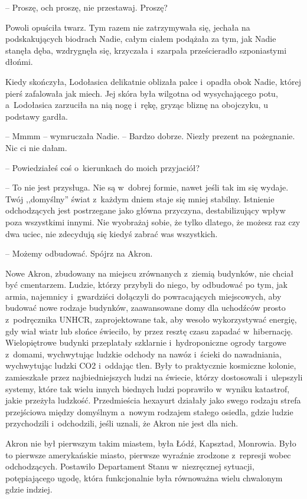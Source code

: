 \documentclass[oneside,polish,11pt,sfheadings]{mwbk}
\begin{document}
-- Proszę, och proszę, nie przestawaj. Proszę?

Powoli opuściła twarz. Tym razem nie zatrzymywała się, jechała na
podskakujących biodrach Nadie, całym ciałem podążała za tym, jak Nadie
stanęła dęba, wzdrygnęła się, krzyczała i~szarpała prześcieradło
szponiastymi dłońmi.

Kiedy skończyła, Lodołasica delikatnie oblizała palce i~opadła obok
Nadie, której pierś zafalowała jak miech. Jej skóra była wilgotna od
wysychającego potu, a~Lodołasica zarzuciła na nią nogę i~rękę, gryząc
bliznę na obojczyku, u podstawy gardła.

-- Mmmm -- wymruczała Nadie. -- Bardzo dobrze. Niezły prezent na
pożegnanie. Nic ci nie dałam.

-- Powiedziałeś coś o~kierunkach do moich przyjaciół?

-- To nie jest przysługa. Nie są w~dobrej formie, nawet jeśli tak im się
wydaje. Twój ,,domyślny'' świat z~każdym dniem staje się mniej stabilny.
Istnienie odchodzących jest postrzegane jako główna przyczyna,
destabilizujący wpływ poza wszystkimi innymi. Nie wyobrażaj sobie, że
tylko dlatego, że możesz raz czy dwa uciec, nie zdecydują się kiedyś
zabrać was wszystkich.

-- Możemy odbudować. Spójrz na Akron.

Nowe Akron, zbudowany na miejscu zrównanych z~ziemią budynków, nie
chciał być cmentarzem. Ludzie, którzy przybyli do niego, by odbudować po
tym, jak armia, najemnicy i~gwardziści dołączyli do powracających
miejscowych, aby budować nowe rodzaje budynków, zaawansowane domy dla
uchodźców prosto z~podręcznika UNHCR, zaprojektowane tak, aby wesoło
wykorzystywać energię, gdy wiał wiatr lub słońce świeciło, by przez
resztę czasu zapadać w~hibernację. Wielopiętrowe budynki przeplatały
szklarnie i~hydroponiczne ogrody targowe z~domami, wychwytując ludzkie
odchody na nawóz i~ścieki do nawadniania, wychwytując ludzki CO2 i~oddając tlen. Były to praktycznie kosmiczne kolonie, zamieszkałe przez
najbiedniejszych ludzi na świecie, którzy dostosowali i~ulepszyli
systemy, które tak wielu innych biednych ludzi poprawiło w~wyniku
katastrof, jakie przeżyła ludzkość. Przedmieścia hexayurt działały jako
swego rodzaju strefa przejściowa między domyślnym a~nowym rodzajem
stałego osiedla, gdzie ludzie przychodzili i~odchodzili, jeśli uznali,
że Akron nie jest dla nich.

Akron nie był pierwszym takim miastem, była Łódź, Kapsztad, Monrowia.
Było to pierwsze amerykańskie miasto, pierwsze wyraźnie zrodzone z~represji wobec odchodzących. Postawiło Departament Stanu w~niezręcznej
sytuacji, potępiającego ugodę, która funkcjonalnie była równoważna wielu
chwalonym gdzie indziej.
\end{document}
